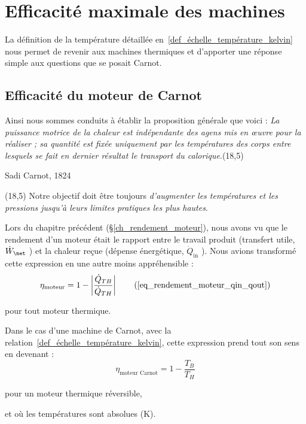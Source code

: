 \section{Efficacité maximale des machines}
\label{ch_efficacite_maximale_machines}
	
	La définition de la température détaillée en~\ref{def_échelle_température_kelvin} nous permet de revenir aux machines thermiques et d’apporter une réponse simple aux questions que se posait Carnot.

	\subsection{Efficacité du moteur de Carnot}
	\label{ch_efficacité_moteur_carnot}

			Ainsi nous sommes conduits à établir la proposition générale que voici :
\emph{La puissance motrice de la chaleur est indépendante des agens mis en œuvre pour la réaliser ; sa quantité est fixée uniquement par les températures des corps entre lesquels se fait en dernier résultat le transport du calorique}.\nolinebreak\makebox(18,5){\color{gray}}\par\vspace{-0.3cm}\begin{flushright}Sadi Carnot, 1824~\cite{carnot1824}\end{flushright}
		\makebox(18,5){\color{gray}}
			Notre objectif doit être toujours \emph{d’augmenter les températures et les pressions jusqu’à leurs limites pratiques les plus hautes}.

		Lors du chapitre précédent (\S\ref{ch_rendement_moteur}), nous avons vu que le rendement d’un moteur était le rapport entre le travail produit (transfert utile, $\dot W_\net$ ) et la chaleur reçue (dépense énergétique, $\dot Q_\text{in}$ ). Nous avions transformé cette expression en une autre moins appréhensible :
		\begin{equation}
			\eta _\text{moteur} = 1 - \left| \frac{\dot Q_{TB}}{\dot Q_{TH}} \right|	\tag{\ref{eq_rendement_moteur_qin_qout}}
		\end{equation}
		\begin{equationterms}
			\item pour tout moteur thermique.
		\end{equationterms}

		Dans le cas d’une machine de Carnot, avec la relation~\ref{def_échelle_température_kelvin}, cette expression prend tout son sens en devenant :
		\begin{equation}
			\eta_\text{moteur Carnot} = 1 - \frac{T_B}{T_H}
			\label{eq_efficacité_moteur_carnot_température}
		\end{equation}
		\begin{equationterms}
			\item pour un moteur thermique réversible,
			\item et où les températures sont absolues (\si{\kelvin}).
		\end{equationterms}

